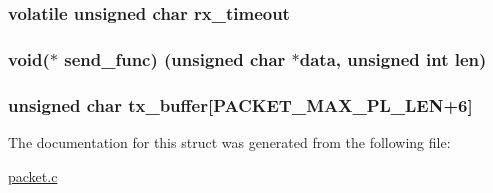 \subsubsection[{rx\+\_\+timeout}]{\setlength{\rightskip}{0pt plus 5cm}volatile unsigned char rx\+\_\+timeout}\label{struct_p_a_c_k_e_t___s_t_a_t_e__t_acd7eb49fabf207bf853ee913680c30e0}
\hypertarget{struct_p_a_c_k_e_t___s_t_a_t_e__t_ad9da6fc089f08736831dcd7554620f68}{}
\subsubsection[{send\+\_\+func}]{\setlength{\rightskip}{0pt plus 5cm}void($\ast$ send\+\_\+func) (unsigned char $\ast$data, unsigned int len)}\label{struct_p_a_c_k_e_t___s_t_a_t_e__t_ad9da6fc089f08736831dcd7554620f68}
\hypertarget{struct_p_a_c_k_e_t___s_t_a_t_e__t_ae03bc7f89e1a660af9d54b0fef09a21f}{}
\subsubsection[{tx\+\_\+buffer}]{\setlength{\rightskip}{0pt plus 5cm}unsigned char tx\+\_\+buffer\mbox{[}{\bf P\+A\+C\+K\+E\+T\+\_\+\+M\+A\+X\+\_\+\+P\+L\+\_\+\+L\+E\+N}+6\mbox{]}}\label{struct_p_a_c_k_e_t___s_t_a_t_e__t_ae03bc7f89e1a660af9d54b0fef09a21f}


The documentation for this struct was generated from the following file\+:\begin{DoxyCompactItemize}
\item 
\hyperlink{packet_8c}{packet.\+c}\end{DoxyCompactItemize}
